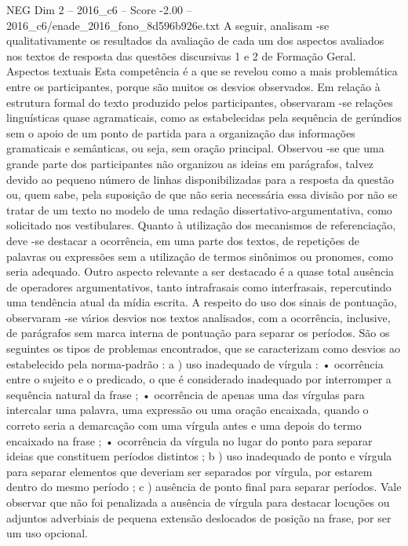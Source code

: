 \begin{textsample}{NEG Dim 2 – 2016\_c6 – Score -2.00 – 2016\_c6/enade\_2016\_fono\_8d596b926e.txt}
A seguir, analisam -se qualitativamente os resultados da avaliação de cada um dos aspectos avaliados nos textos de resposta das questões discursivas 1 e 2 de Formação Geral.
Aspectos textuais Esta competência é a que se revelou como a mais problemática entre os participantes, porque são muitos os desvios observados.
Em relação à estrutura formal do texto produzido pelos participantes, observaram -se relações linguísticas quase agramaticais, como as estabelecidas pela sequência de gerúndios sem o apoio de um ponto de partida para a organização das informações gramaticais e semânticas, ou seja, sem oração principal.
Observou -se que uma grande parte dos participantes não organizou as ideias em parágrafos, talvez devido ao pequeno número de linhas disponibilizadas para a resposta da questão ou, quem sabe, pela suposição de que não seria necessária essa divisão por não se tratar de um texto no modelo de uma redação dissertativo-argumentativa, como solicitado nos vestibulares.
Quanto à utilização dos mecanismos de referenciação, deve -se destacar a ocorrência, em uma parte dos textos, de repetições de palavras ou expressões sem a utilização de termos sinônimos ou pronomes, como seria adequado.
Outro aspecto relevante a ser destacado é a quase total ausência de operadores argumentativos, tanto intrafrasais como interfrasais, repercutindo uma tendência atual da mídia escrita.
A respeito do uso dos sinais de pontuação, observaram -se vários desvios nos textos analisados, com a ocorrência, inclusive, de parágrafos sem marca interna de pontuação para separar os períodos.
São os seguintes os tipos de problemas encontrados, que se caracterizam como desvios ao estabelecido pela norma-padrão : a ) uso inadequado de vírgula : • ocorrência entre o sujeito e o predicado, o que é considerado inadequado por interromper a sequência natural da frase ; • ocorrência de apenas uma das vírgulas para intercalar uma palavra, uma expressão ou uma oração encaixada, quando o correto seria a demarcação com uma vírgula antes e uma depois do termo encaixado na frase ; • ocorrência da vírgula no lugar do ponto para separar ideias que constituem períodos distintos ; b ) uso inadequado de ponto e vírgula para separar elementos que deveriam ser separados por vírgula, por estarem dentro do mesmo período ; c ) ausência de ponto final para separar períodos.
Vale observar que não foi penalizada a ausência de vírgula para destacar locuções ou adjuntos adverbiais de pequena extensão deslocados de posição na frase, por ser um uso opcional.

\end{textsample}
